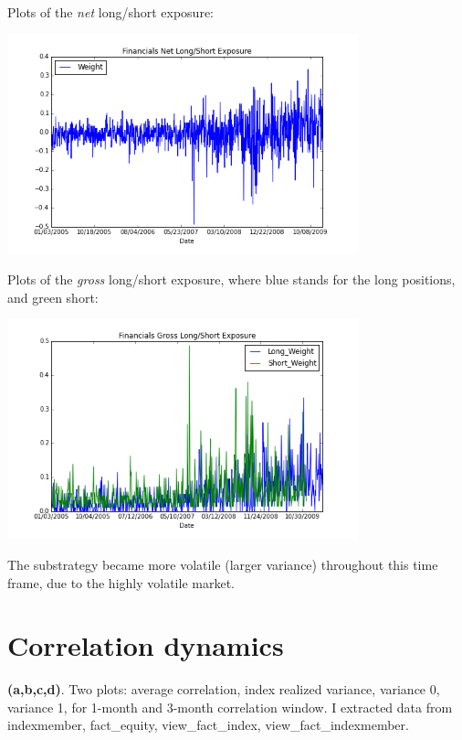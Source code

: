\documentclass[11pt,letter]{article}
\begin{document}
Plots of the \textit{net} long/short exposure:

\begin{center}
\includegraphics[width=4in,keepaspectratio]{3d}
\end{center}

Plots of the \textit{gross} long/short exposure, where blue stands for the long positions, and green short:

\begin{center}
\includegraphics[width=4in,keepaspectratio]{3d_2}
\end{center}

The substrategy became more volatile (larger variance) throughout this time frame, due to the highly volatile market.

\section{Correlation dynamics}
\textbf{(a,b,c,d)}. Two plots: average correlation, index realized variance, variance 0, variance 1, for 1-month and 3-month correlation window. I extracted data from indexmember, fact\_equity, view\_fact\_index, view\_fact\_indexmember.
\end{document}
